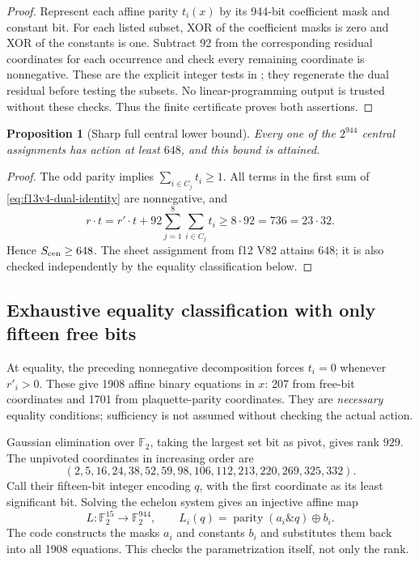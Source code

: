 \documentclass[11pt,oneside]{article}
\newtheorem{proposition}[theorem]{Proposition}
\begin{document}
\begin{proof}
Represent each affine parity \(t_i(x)\) by its 944-bit
coefficient mask and constant bit. For each listed subset,
XOR of the coefficient masks is zero and XOR of the
constants is one. Subtract 92 from the corresponding
residual coordinates for each occurrence and check every
remaining coordinate is nonnegative. These are the explicit
integer tests in
;
they regenerate the dual residual before testing the subsets.
No linear-programming output is trusted without these checks.
Thus the finite certificate proves both assertions.
\end{proof}

\begin{proposition}[Sharp full central lower bound]
\label{prop:f13v4-sharp}
Every one of the \(2^{944}\) central assignments has action
at least \(648\), and this bound is attained.
\end{proposition}

\begin{proof}
The odd parity implies \(\sum_{i\in C_j}t_i\ge1\).
All terms in the first sum of
\eqref{eq:f13v4-dual-identity} are nonnegative, and
\[
 r\cdot t
 =r'\cdot t+92\sum_{j=1}^8\sum_{i\in C_j}t_i
 \ge 8\cdot92=736=23\cdot32.
\]
Hence \(S_{\rm cen}\ge648\). The sheet assignment from
f12 V82 attains \(648\); it is also checked independently
by the equality classification below.
\end{proof}

\subsection{Exhaustive equality classification with only fifteen free bits}

At equality, the preceding nonnegative decomposition forces
\(t_i=0\) whenever \(r'_i>0\). These give 1908 affine
binary equations in \(x\): 207 from free-bit coordinates
and 1701 from plaquette-parity coordinates. They are
\emph{necessary} equality conditions; sufficiency is not
assumed without checking the actual action.

Gaussian elimination over \(\mathbb F_2\), taking the
largest set bit as pivot, gives rank \(929\). The unpivoted
coordinates in increasing order are
\begin{equation}\label{eq:f13v4-free}
 (2,5,16,24,38,52,59,98,106,112,213,220,269,325,332).
\end{equation}
Call their fifteen-bit integer encoding \(q\), with the
first coordinate as its least significant bit. Solving
the echelon system gives an injective affine map
\[
 L:\mathbb F_2^{15}\longrightarrow\mathbb F_2^{944},
 \qquad L_i(q)=\operatorname{parity}(a_i\mathbin{\&}q)
                    \mathbin{\oplus} b_i .
\]
The code constructs the masks \(a_i\) and constants \(b_i\)
and substitutes them back into all 1908 equations. This
checks the parametrization itself, not only the rank.
\end{document}
